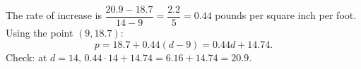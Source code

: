The rate of increase is $\dfrac{20.9-18.7}{14-9}=\dfrac{2.2}{5}=0.44$ pounds per square inch per foot. Using the point $(9,18.7)$:
\[p=18.7+0.44(d-9)=\boxed{0.44d+14.74}.\]
Check: at $d=14$, $0.44\cdot14+14.74=6.16+14.74=20.9$.
